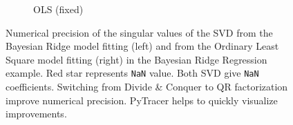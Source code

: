 \documentclass[10pt,journal,compsoc]{IEEEtran}
\DeclareRobustCommand{\add}[1]{#1}
\begin{document}
\begin{figure}
\begin{subfigure}{0.49\linewidth}
        \caption{OLS (fixed)}
        \label{fig:OLS_svd_fixed}
    \end{subfigure}
    \caption{\add{Numerical precision of the singular values of the SVD from the
            Bayesian Ridge model fitting (left) and from the Ordinary Least Square model
            fitting (right) in the Bayesian Ridge Regression example. Red star
            represents \texttt{NaN} value. Both SVD give \texttt{NaN} coefficients.
            Switching from Divide \& Conquer to QR factorization improve numerical precision.
            PyTracer helps to quickly visualize improvements.}}
\end{figure}










\end{document}

